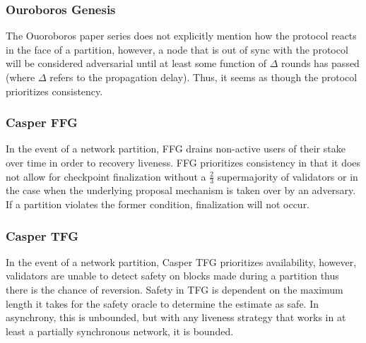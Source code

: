 \documentclass[10pt,journal,compsoc]{IEEEtran}
\begin{document}
\subsubsection{Ouroboros Genesis} The Ouoroboros paper series does not explicitly mention how the protocol reacts in the face of a partition, however, a node that is out of sync with the protocol will be considered adversarial until at least some function of $\Delta$ rounds has passed (where $\Delta$ refers to the propagation delay). Thus, it seems as though the protocol prioritizes consistency. 

\subsubsection{Casper FFG} In the event of a network partition, FFG drains non-active users of their stake over time in order to recovery liveness. FFG prioritizes consistency in that it does not allow for checkpoint finalization without a \(\frac{2}{3}\) supermajority of validators or in the case when the underlying proposal mechanism is taken over by an adversary. If a partition violates the former condition, finalization will not occur. 

\subsubsection{Casper TFG} In the event of a network partition, Casper TFG prioritizes availability, however, validators are unable to detect safety on blocks made during a partition thus there is the chance of reversion. Safety in TFG is dependent on the maximum length it takes for the safety oracle to determine the estimate as safe. In asynchrony, this is unbounded, but with any liveness strategy that works in at least a partially synchronous network, it is bounded.      
%
%
\end{document}
